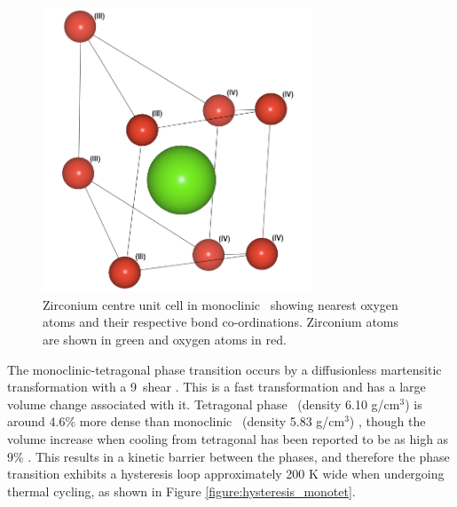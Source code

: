 \begin{figure}[htp] %
\centering
\includegraphics[height=8.5cm]{images/zr_centre_mono.png}
\caption{Zirconium centre unit cell in monoclinic \zirconia\ showing nearest oxygen atoms and their respective bond co-ordinations. Zirconium atoms are shown in green and oxygen atoms in red.}
\label{figure:monoschottky}
\end{figure}


The monoclinic-tetragonal phase transition occurs by a diffusionless martensitic transformation with a 9\textdegree\ shear \cite{Subbarao1974}. This is a fast transformation and has a large volume change associated with it. Tetragonal phase \zirconia\ (density 6.10 g/cm$^{3}$) is around 4.6\% more dense than monoclinic \zirconia\ (density 5.83 g/cm$^{3}$) \cite{McCullough2002}, though the volume increase when cooling from tetragonal has been reported to be as high as 9\% \cite{Gupta1977}. This results in a kinetic barrier between the phases, and therefore the phase transition exhibits a hysteresis loop approximately 200 K wide when undergoing thermal cycling, as shown in Figure \ref{figure:hysteresis_monotet}.

